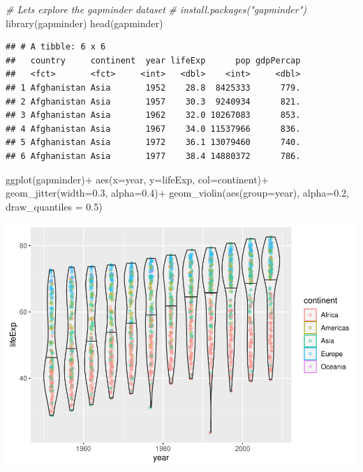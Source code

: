 \documentclass[
]{article}
\newenvironment{Shaded}{\begin{snugshade}}{\end{snugshade}}
\newcommand{\AttributeTok}[1]{\textcolor[rgb]{0.77,0.63,0.00}{#1}}
\newcommand{\CommentTok}[1]{\textcolor[rgb]{0.56,0.35,0.01}{\textit{#1}}}
\newcommand{\FloatTok}[1]{\textcolor[rgb]{0.00,0.00,0.81}{#1}}
\newcommand{\FunctionTok}[1]{\textcolor[rgb]{0.00,0.00,0.00}{#1}}
\newcommand{\NormalTok}[1]{#1}
\newcommand{\SpecialCharTok}[1]{\textcolor[rgb]{0.00,0.00,0.00}{#1}}
\begin{document}
\begin{Shaded}
\begin{Highlighting}[]
\CommentTok{\# Let\textquotesingle{}s explore the gapminder dataset}
\CommentTok{\# install.packages("gapminder")}
\FunctionTok{library}\NormalTok{(gapminder)}
\FunctionTok{head}\NormalTok{(gapminder)}
\end{Highlighting}
\end{Shaded}

\begin{verbatim}
## # A tibble: 6 x 6
##   country     continent  year lifeExp      pop gdpPercap
##   <fct>       <fct>     <int>   <dbl>    <int>     <dbl>
## 1 Afghanistan Asia       1952    28.8  8425333      779.
## 2 Afghanistan Asia       1957    30.3  9240934      821.
## 3 Afghanistan Asia       1962    32.0 10267083      853.
## 4 Afghanistan Asia       1967    34.0 11537966      836.
## 5 Afghanistan Asia       1972    36.1 13079460      740.
## 6 Afghanistan Asia       1977    38.4 14880372      786.
\end{verbatim}

\begin{Shaded}
\begin{Highlighting}[]
\FunctionTok{ggplot}\NormalTok{(gapminder)}\SpecialCharTok{+}
  \FunctionTok{aes}\NormalTok{(}\AttributeTok{x=}\NormalTok{year, }\AttributeTok{y=}\NormalTok{lifeExp, }\AttributeTok{col=}\NormalTok{continent)}\SpecialCharTok{+}
  \FunctionTok{geom\_jitter}\NormalTok{(}\AttributeTok{width=}\FloatTok{0.3}\NormalTok{, }\AttributeTok{alpha=}\FloatTok{0.4}\NormalTok{)}\SpecialCharTok{+}
  \FunctionTok{geom\_violin}\NormalTok{(}\FunctionTok{aes}\NormalTok{(}\AttributeTok{group=}\NormalTok{year), }\AttributeTok{alpha=}\FloatTok{0.2}\NormalTok{, }\AttributeTok{draw\_quantiles =} \FloatTok{0.5}\NormalTok{)}
\end{Highlighting}
\end{Shaded}

\includegraphics{class05_files/figure-latex/unnamed-chunk-1-6.pdf}
\end{document}
